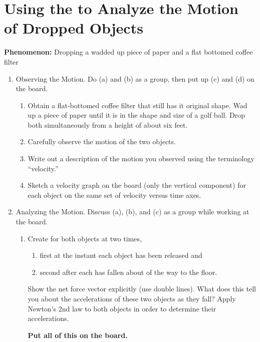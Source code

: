 \section{Using the \FModel{} to Analyze the Motion of Dropped Objects}
\label{act8.2.1}

\textbf{Phenomenon:} Dropping a wadded up piece of paper and a flat bottomed coffee filter

\begin{enumerate}
	\item Observing the Motion. Do (a) and (b) as a group, then put up (c) and (d) on the board.
	
	\begin{enumerate}
		\item Obtain a flat-bottomed coffee filter that still has it original shape. Wad up a piece of paper until it is in the shape and size of a golf ball. Drop both simultaneously from a height of about six feet.
		
		\item Carefully observe the motion of the two objects.
		
		\item Write out a description of the motion you observed using the terminology ``velocity.''
		
		\item Sketch a velocity graph on the board (only the vertical component) for each object on the same set of velocity versus time axes.
	\end{enumerate}

\WCD

	\item Analyzing the Motion. Discuss (a), (b), and (c) as a group while working at the board.
	
	\begin{enumerate}
		\item Create \forcediags{} for both objects at two times, 
		\begin{enumerate}
			\item first at the instant each object has been released and
			\item second after each has fallen about  of the way to the floor.
		\end{enumerate}
		Show the net force vector explicitly (use double lines). What does this tell you about the accelerations of these two objects as they fall? Apply Newton's 2nd law to both objects in order to determine their accelerations.
		
			\textbf{Put all of this on the board.}
		

\end{enumerate}
\end{enumerate}
